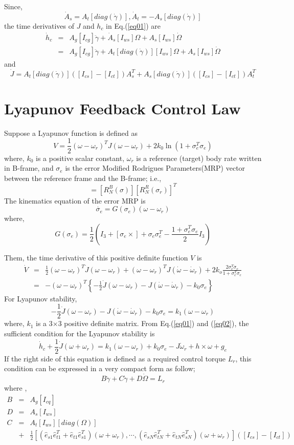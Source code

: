 \documentclass[12pt]{article}
\newcommand{\beq}{\begin{equation}}
\newcommand{\eeq}{\end{equation}}
\newcommand{\beqa}{\begin{eqnarray}}
\newcommand{\eeqa}{\end{eqnarray}}
\begin{document}
Since,
\[ \dot{A}_s = A_t [diag(\dot{\gamma})], \dot{A}_t = - A_s
[diag(\dot{\gamma})]\] the time derivatives of $J$ and $h_c$ in
Eq.(\ref{eq01}) are \beqa \dot{h}_c &=& A_g [I_{cg}]\ddot{\gamma}
+ \dot{A}_s [I_{ws}]\Omega + A_s [I_{ws}]\dot{\Omega} \\ &=&A_g
[I_{cg}]\ddot{\gamma} + A_t [diag(\dot{\gamma})] [I_{ws}]\Omega +
A_s [I_{ws}]\dot{\Omega} \eeqa and \cite{ford1} \beq \dot{J} = A_t
[diag(\dot{\gamma})]([I_{cs}]-[I_{ct}])A_s^T + A_s
[diag(\dot{\gamma})]([I_{cs}]-[I_{ct}])A_t^T \eeq

\section{Lyapunov Feedback Control Law}

Suppose a Lyapunov function is defined as \cite{tsiotras1}
\beq V
= \frac{1}{2} (\omega - \omega_r)^T J (\omega - \omega_r) + 2 k_0
\ln{ ( 1 + \sigma^T_e \sigma_e ) }\eeq
where, $k_0$ is a positive
scalar constant, $\omega_r$ is a reference (target) body rate
written in B-frame, and $\sigma_e$ is the error Modified Rodrigues
Parameters(MRP) vector between the reference frame and the
B-frame; i.e., \beq [R^B_R (\sigma_e )] =[R^B_N (\sigma)] [R^R_N
(\sigma_r )]^T \eeq The kinematics equation of the error MRP is
\beq \dot{\sigma_e} = G(\sigma_e ) (\omega -\omega_r ) \eeq where,
\beq G(\sigma_e ) = \frac{1}{2} \left( I_3 + [\sigma_e \times ] +
\sigma_e \sigma_e^T - \frac{1+\sigma_e^T \sigma_e}{2} I_3 \right)
\eeq

Them, the time derivative of this positive definite function $V$
is
\beqa
\dot{V} &=& \frac{1}{2} (\omega - \omega_r)^T \dot{J} (\omega - \omega_r)
+ (\omega - \omega_r)^T J (\dot{\omega} - \dot{\omega}_r)
+ 2 k_o \frac{2 \sigma_e^T \dot{\sigma}_e}{1 + \sigma^T_e
\sigma_e}\\
&=& -(\omega-\omega_r )^T \left\{ -\frac{1}{2} \dot{J} (\omega-\omega_r
)- J(\dot{\omega} - \dot{\omega}_r) - k_0 \sigma_e \right\}
\eeqa
For Lyapunov stability,
\beq
-\frac{1}{2} \dot{J} (\omega-\omega_r
)- J(\dot{\omega} - \dot{\omega}_r) - k_0 \sigma_e = k_1
(\omega-\omega_r )
\eeq
where, $k_1$ is a 3$\times$3 positive definite matrix.
From Eq.(\ref{eq01}) and (\ref{eq02}), the sufficient condition for the Lyapunov stability is
\beq
\dot{h}_c + \frac{1}{2} \dot{J} (\omega+\omega_r ) = k_1 (\omega-\omega_r )
+ k_0 \sigma_e - J \dot{\omega}_r + h \times \omega + g_e
\eeq
If the right side of this equation is defined as a required control torque $L_r$, this
condition can be expressed in a very compact form as follow;
\beq
B \ddot{\gamma} + C\dot{\gamma} + D\dot{\Omega} = L_r \label{eq03}
\eeq
where \cite{ford2},
\beqa
B &=& A_g [ I_{cq} ] \\
D &=& A_s [ I_{ws} ] \\
C &=& A_t [ I_{ws} ][diag(\Omega)] \\ &+& \frac{1}{2}
[(\hat{e}_{s1}\hat{e}_{t1}^T +
\hat{e}_{t1}\hat{e}_{s1}^T)(\omega+\omega_r ) , \cdots ,(\hat{e}_{sN}\hat{e}_{tN}^T +
\hat{e}_{tN}\hat{e}_{sN}^T)(\omega+\omega_r )]
([I_{cs}]-[I_{ct}])
\eeqa
\end{document}
